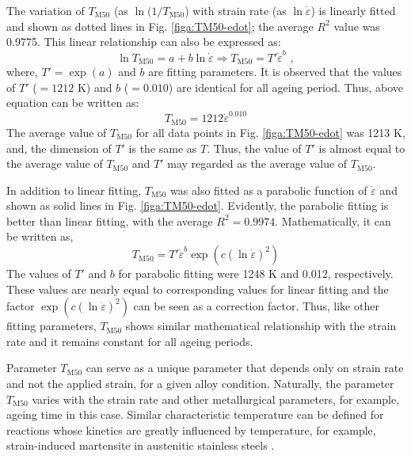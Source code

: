 \documentclass[a4paper, 11pt, dvipsnames]{article}
\begin{document}
The variation of $T_{\text{M50}}$ (as $\ln(1/T_{\text{M50}}$) with strain rate (as $\ln \dot{\varepsilon}$) is linearly fitted and shown as dotted lines in Fig. \ref{figa:TM50-edot}; the average $R^2$ value was 0.9775. This linear relationship can also be expressed as:
\begin{equation*}
\ln T_{\text{M50}} = a + b\ln\dot{\varepsilon} \Rightarrow T_{\text{M50}} = T'\dot{\varepsilon}^{b} \,\, , 
\end{equation*}
where, $T' = \exp(a)$ and $b$ are fitting parameters. It is observed that the values of $T'$ ($= 1212$ K) and $b$ ($= 0.010$) are identical for all ageing period. Thus, above equation can be written as:
\begin{equation*}
T_{\text{M50}} = 1212\dot{\varepsilon}^{0.010}
\end{equation*}
The average value of $T_{\text{M50}}$ for all data points in Fig. \ref{figa:TM50-edot} was 1213 K, and, the dimension of $T'$ is the same as $T$. Thus, the value of $T'$ is almost equal to the average value of $T_{\text{M50}}$ and $T'$ may regarded as the average value of $T_{\text{M50}}$.

In addition to linear fitting, $T_{\text{M50}}$ was also fitted as a parabolic function of $\dot{\varepsilon}$ and shown as solid lines in Fig. \ref{figa:TM50-edot}. Evidently, the parabolic fitting is better than linear fitting, with the average $R^2 = 0.9974$. Mathematically, it can be written as,
\begin{equation*}
T_{\text{M50}} = T'\dot{\varepsilon}^{b}\exp(c\left(\ln\dot{\varepsilon}\right)^2)
\end{equation*}
The values of $T'$ and $b$ for parabolic fitting were 1248 K and 0.012, respectively. These values are nearly equal to corresponding values for linear fitting and the factor $\exp(c\left(\ln\dot{\varepsilon}\right)^2)$ can be seen as a correction factor. Thus, like other fitting parameters, $T_{\text{M50}}$ shows similar mathematical relationship with the strain rate and it remains constant for all ageing periods.

Parameter $T_{\text{M50}}$ can serve as a unique parameter that depends only on strain rate and not the applied strain, for a given alloy condition. Naturally, the parameter $T_{\text{M50}}$ varies with the strain rate and other metallurgical parameters, for example, ageing time in this case. Similar characteristic temperature can be defined for reactions whose kinetics are greatly influenced by temperature, for example, strain-induced martensite in austenitic stainless steels \cite{Y2}.
\end{document}

